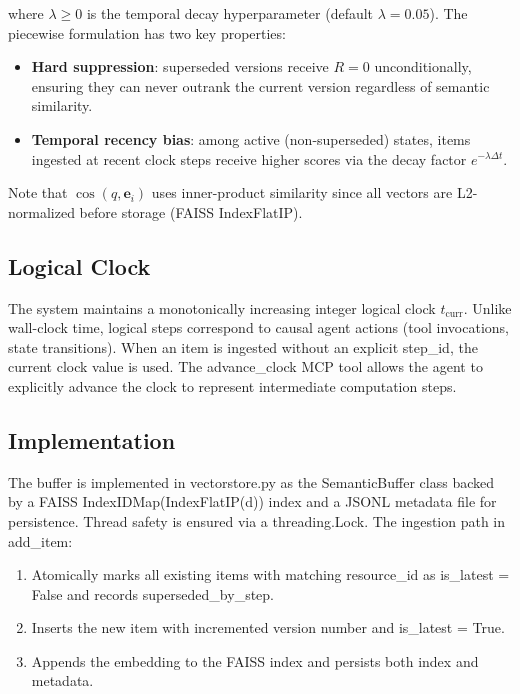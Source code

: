 \documentclass[lettersize,journal]{IEEEtran}
\begin{document}
where $\lambda \geq 0$ is the temporal decay hyperparameter (default $\lambda = 0.05$). The piecewise formulation has two key properties:

\begin{itemize}
    \item \textbf{Hard suppression}: superseded versions receive $R = 0$ unconditionally, ensuring they can never outrank the current version regardless of semantic similarity.
    \item \textbf{Temporal recency bias}: among active (non-superseded) states, items ingested at recent clock steps receive higher scores via the decay factor $e^{-\lambda \Delta t}$.
\end{itemize}

Note that $\cos(q, \mathbf{e}_i)$ uses inner-product similarity since all vectors are L2-normalized before storage (FAISS IndexFlatIP).

\subsection{Logical Clock}

The system maintains a monotonically increasing integer logical clock $t_{\text{curr}}$. Unlike wall-clock time, logical steps correspond to causal agent actions (tool invocations, state transitions). When an item is ingested without an explicit step\_id, the current clock value is used. The advance\_clock MCP tool allows the agent to explicitly advance the clock to represent intermediate computation steps.

\subsection{Implementation}

The buffer is implemented in vectorstore.py as the SemanticBuffer class backed by a FAISS IndexIDMap(IndexFlatIP(d)) index and a JSONL metadata file for persistence. Thread safety is ensured via a threading.Lock. The ingestion path in add\_item:

\begin{enumerate}
    \item Atomically marks all existing items with matching resource\_id as is\_latest = False and records superseded\_by\_step.
    \item Inserts the new item with incremented version number and is\_latest = True.
    \item Appends the embedding to the FAISS index and persists both index and metadata.
\end{enumerate}
\end{document}
